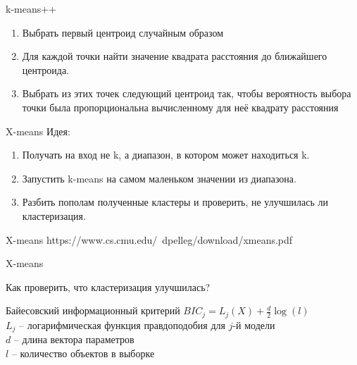 \documentclass[10pt]{beamer}
\begin{document}
\begin{frame}{k-means++}
	\begin{enumerate}
		\item Выбрать первый центроид случайным образом
		\item Для каждой точки найти значение квадрата расстояния до ближайшего центроида.
		\item Выбрать из этих точек следующий центроид так, чтобы вероятность выбора точки была пропорциональна вычисленному для неё квадрату расстояния
	\end{enumerate}
\end{frame}

\begin{frame}{X-means}
	\alert{Идея}:\\
	\begin{enumerate}
		\item Получать на вход не k, а диапазон, в котором может находиться k.
		\item Запустить k-means на самом маленьком значении из диапазона.
		\item Разбить пополам полученные кластеры и проверить, не улучшилась ли кластеризация.
	\end{enumerate}
\end{frame}

\begin{frame}{X-means}
https://www.cs.cmu.edu/~dpelleg/download/xmeans.pdf
\end{frame}

\begin{frame}{X-means}
  \begin{center}
    Как проверить, что кластеризация улучшилась?
  \end{center}
\end{frame}

\begin{frame}{Байесовский информационный критерий}
	$BIC_j = L_j(X)  + \frac{d}{2} \log(l)$\\
	\bigbreak
	$L_j$ -- логарифмическая функция правдоподобия для $j$-й модели \\
	$d$ -- длина вектора параметров\\
	$l$ -- количество объектов в выборке\\
\end{frame}
\end{document}
